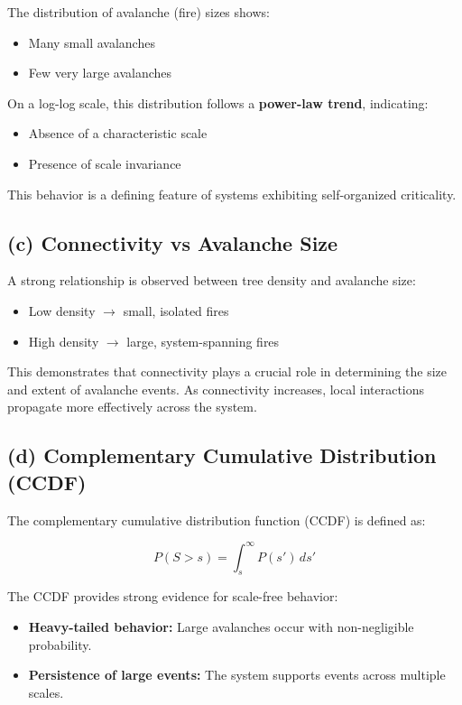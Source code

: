 \documentclass[12pt,a4paper]{article}
\begin{document}
The distribution of avalanche (fire) sizes shows:

\begin{itemize}
\item Many small avalanches
\item Few very large avalanches
\end{itemize}

On a log-log scale, this distribution follows a \textbf{power-law trend}, indicating:

\begin{itemize}
\item Absence of a characteristic scale
\item Presence of scale invariance
\end{itemize}

This behavior is a defining feature of systems exhibiting self-organized criticality.

\subsection{(c) Connectivity vs Avalanche Size}

A strong relationship is observed between tree density and avalanche size:

\begin{itemize}
\item Low density $\rightarrow$ small, isolated fires
\item High density $\rightarrow$ large, system-spanning fires
\end{itemize}

This demonstrates that connectivity plays a crucial role in determining the size and extent of avalanche events. As connectivity increases, local interactions propagate more effectively across the system.

\subsection{(d) Complementary Cumulative Distribution (CCDF)}

The complementary cumulative distribution function (CCDF) is defined as:

\begin{equation}
P(S > s) = \int_s^{\infty} P(s') \, ds'
\end{equation}

The CCDF provides strong evidence for scale-free behavior:

\begin{itemize}
\item \textbf{Heavy-tailed behavior:} Large avalanches occur with non-negligible probability.
\item \textbf{Persistence of large events:} The system supports events across multiple scales.
\end{itemize}
\end{document}
